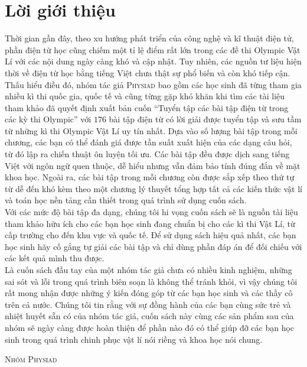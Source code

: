 \chapter*{Lời giới thiệu}
Thời gian gần đây, theo xu hướng phát triển của công nghệ và kĩ thuật điện tử, phần điện từ học cũng chiếm một tỉ lệ điểm rất lớn trong các đề thi Olympic Vật Lí với các nội dung ngày càng khó và cập nhật. Tuy nhiên,
các nguồn tư liệu hiện thời về điện từ học bằng tiếng Việt chưa thật sự phổ biến và còn khó tiếp cận. Thấu hiểu điều đó, nhóm tác giả \textsc{Physiad} bao gồm các học sinh đã từng tham gia nhiều kì thi quốc gia, quốc tế và cũng từng gặp khó khăn khi tìm các tài liệu tham khảo đã quyết định xuất bản cuốn ``Tuyển tập các bài tập điện từ trong các kỳ thi Olympic'' với $176$ bài tập điện từ có lời giải được tuyển tập và sưu tầm từ những kì thi Olympic Vật Lí uy tín nhất. Dựa vào số lượng bài tập trong mỗi chương, các bạn có thể đánh giá được tần suất xuất hiện của các dạng câu hỏi, từ đó lập ra chiến thuật ôn luyện tối ưu. Các bài tập đều được dịch sang tiếng Việt với ngôn ngữ quen thuộc, dễ hiểu nhưng vẫn đảm bảo tính đúng đắn về mặt khoa học. Ngoài ra, các bài tập trong mỗi chương còn được sắp xếp theo thứ tự từ dễ đến khó kèm theo một chương lý thuyết tổng hợp tất cả các kiến thức vật lí và toán học nền tảng cần thiết trong quá trình sử dụng cuốn sách.\\

Với các mức độ bài tập đa dạng, chúng tôi hi vọng cuốn sách sẽ là nguồn tài liệu tham khảo hữu ích cho các bạn học sinh đang chuẩn bị cho các kì thi Vật Lí, từ cấp trường cho đến khu vực và quốc tế. Để sử dụng sách hiệu quả nhất, các bạn học sinh hãy cố gắng tự giải các bài tập và chỉ dùng phần đáp án để đối chiếu với các kết quả mình thu được.\\
Là cuốn sách đầu tay của một nhóm tác giả chưa có nhiều kinh nghiệm, những sai sót và lỗi trong quá trình biên soạn là không thể tránh khỏi, vì vậy chúng tôi rất mong nhận được những ý kiến đóng góp từ các bạn học sinh và các thầy cô trên cả nước. Chúng tôi tin rằng với sự đồng hành của các bạn cùng sức trẻ và nhiệt huyết sẵn có của nhóm tác giả, cuốn sách này cùng các sản phẩm sau của nhóm sẽ ngày càng được hoàn thiện để phần nào đó có thể giúp đỡ các bạn học sinh trong quá trình chinh phục vật lí nói riềng và khoa học nói chung.
\begin{flushright}
\large\textsc{Nhóm Physiad}
\end{flushright}
